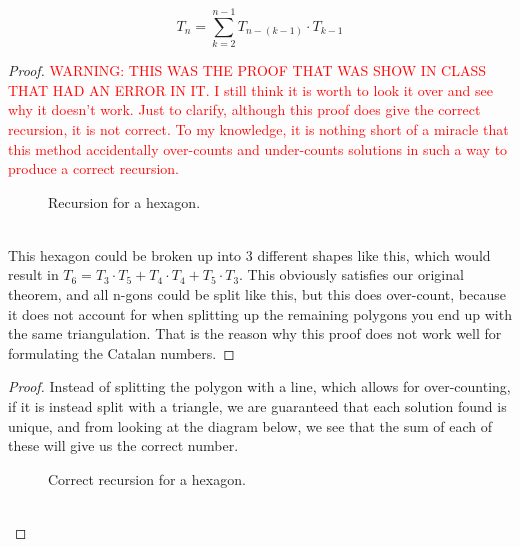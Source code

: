 \begin{theorem}
	$$T_n = \sum_{k=2}^{n-1}T_{n-(k-1)}\cdot T_{k-1}$$
\end{theorem}
\begin{proof}
	\textcolor{red}{WARNING: THIS WAS THE PROOF THAT WAS SHOW IN CLASS THAT HAD AN ERROR IN IT. I still think it is worth to look it over and see why it doesn't work. Just to clarify, although this proof does give the correct recursion, it is not correct. To my knowledge, it is nothing short of a miracle that this method accidentally over-counts and under-counts solutions in such a way to produce a correct recursion.}
	\begin{figure}[h]
        \caption{Recursion for a hexagon.}
        \label{fig:hex1}
    \end{figure}\\
    This hexagon could be broken up into 3 different shapes like this, which would result in $T_6 = T_3\cdot T_5 + T_4\cdot T_4 + T_5\cdot T_3$. This obviously satisfies our original theorem, and all n-gons could be split like this, but this does over-count, because it does not account for when splitting up the remaining polygons you end up with the same triangulation. That is the reason why this proof does not work well for formulating the Catalan numbers.
\end{proof}
\begin{proof}
    Instead of splitting the polygon with a line, which allows for over-counting, if it is instead split with a triangle, we are guaranteed that each solution found is unique, and from looking at the diagram below, we see that the sum of each of these will give us the correct number.
    \begin{figure}[h]
        \caption{Correct recursion for a hexagon.}
        \label{fig:hex2}
    \end{figure}\\
\end{proof}

